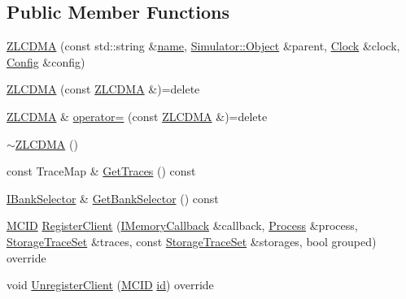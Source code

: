 \subsection*{Public Member Functions}
\begin{DoxyCompactItemize}
\item 
\hyperlink{class_simulator_1_1_z_l_c_d_m_a_a8a1105ba7f8a9a2f1c68d5ec8853c310}{Z\+L\+C\+D\+M\+A} (const std\+::string \&\hyperlink{mtconf_8c_a8f8f80d37794cde9472343e4487ba3eb}{name}, \hyperlink{class_simulator_1_1_object}{Simulator\+::\+Object} \&parent, \hyperlink{class_simulator_1_1_clock}{Clock} \&clock, \hyperlink{class_config}{Config} \&config)
\item 
\hyperlink{class_simulator_1_1_z_l_c_d_m_a_a5e46b51f20d65b252a23c583571ce8e3}{Z\+L\+C\+D\+M\+A} (const \hyperlink{class_simulator_1_1_z_l_c_d_m_a}{Z\+L\+C\+D\+M\+A} \&)=delete
\item 
\hyperlink{class_simulator_1_1_z_l_c_d_m_a}{Z\+L\+C\+D\+M\+A} \& \hyperlink{class_simulator_1_1_z_l_c_d_m_a_ac50a513a7943fac1da353a7be12c7094}{operator=} (const \hyperlink{class_simulator_1_1_z_l_c_d_m_a}{Z\+L\+C\+D\+M\+A} \&)=delete
\item 
\hyperlink{class_simulator_1_1_z_l_c_d_m_a_a08df75ef9fa40cd169d7d7f446fe7ce6}{$\sim$\+Z\+L\+C\+D\+M\+A} ()
\item 
const Trace\+Map \& \hyperlink{class_simulator_1_1_z_l_c_d_m_a_a77d206e76f434984dc3bde2cf28e1c6e}{Get\+Traces} () const 
\item 
\hyperlink{class_simulator_1_1_i_bank_selector}{I\+Bank\+Selector} \& \hyperlink{class_simulator_1_1_z_l_c_d_m_a_af0869576872f2f781a60c562da5cf984}{Get\+Bank\+Selector} () const 
\item 
\hyperlink{namespace_simulator_a4b5747ff30c62c6373badf3b53b9abf7}{M\+C\+I\+D} \hyperlink{class_simulator_1_1_z_l_c_d_m_a_ae494186f3ac512bfde352d7770281462}{Register\+Client} (\hyperlink{class_simulator_1_1_i_memory_callback}{I\+Memory\+Callback} \&callback, \hyperlink{class_simulator_1_1_process}{Process} \&process, \hyperlink{class_simulator_1_1_storage_trace_set}{Storage\+Trace\+Set} \&traces, const \hyperlink{class_simulator_1_1_storage_trace_set}{Storage\+Trace\+Set} \&storages, bool grouped) override
\item 
void \hyperlink{class_simulator_1_1_z_l_c_d_m_a_a86273d85625f3e1ab3d8945f0f39b44a}{Unregister\+Client} (\hyperlink{namespace_simulator_a4b5747ff30c62c6373badf3b53b9abf7}{M\+C\+I\+D} \hyperlink{mtconf_8c_aa3185401f04d30bd505daebf48c39cc5}{id}) override
\item 

\end{DoxyCompactItemize}
